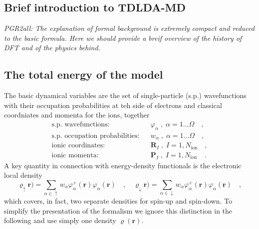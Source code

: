 \documentclass[final,1p]{elsarticle}
\newcommand{\PGRcomm}[1]{{\color{blue}\small\em PGR2all: #1}}
\begin{document}
\subsection{Brief introduction to TDLDA-MD}

\PGRcomm{The explanation of formal background is extremely compact and
reduced to the basic formula. Here we should provide a breif overview
of the history of DFT and of the physics behind.}

\subsection{The total energy of the model}
\label{sec:Etot}

The basic dynamical variables are the set of single-particle
(s.p.) wavefunctions with their occupation probabilities at teh side
of electrons and classical coordniates and momenta for the ions,
together
\begin{equation}
\begin{array}{lcl}
  \mbox{s.p. wavefunctions:} && 
  \varphi_\alpha\;,\;\alpha=1...\Omega
  \quad,
\\
  \mbox{s.p. occupation probabilities:} && 
  w_\alpha\;,\;\alpha=1...\Omega
  \quad,
\\
  \mbox{ionic coordinates:} &&
  \mathbf{R}_I\;,\; I=1,N_\mathrm{ion}
  \quad,
\\
  \mbox{ionic momenta:} &&
  \mathbf{P}_I\;,\; I=1,N_\mathrm{ion}
  \quad.
\end{array}
\end{equation}
A key quantity in connection with energy-density functionals
is the electronic local density 
\begin{equation}
  \varrho_\uparrow\mathbf{r})
  =
  \sum_{\alpha\in\uparrow}w_\alpha
  \varphi_\alpha^+(\mathbf{r})\varphi_\alpha^{\mbox{}}(\mathbf{r})
  \quad,\quad
  \varrho_\downarrow\mathbf{r})
  =
  \sum_{\alpha\in\downarrow}w_\alpha
  \varphi_\alpha^+(\mathbf{r})\varphi_\alpha^{\mbox{}}(\mathbf{r})
  \quad,
\end{equation}
which covers, in fact, two separate densities for spin-up and
spin-down. To simplify the presentation of the formalism we
ignore this distinction in the following and use simply
one density $\varrho(\mathbf{r})$.
\end{document}
